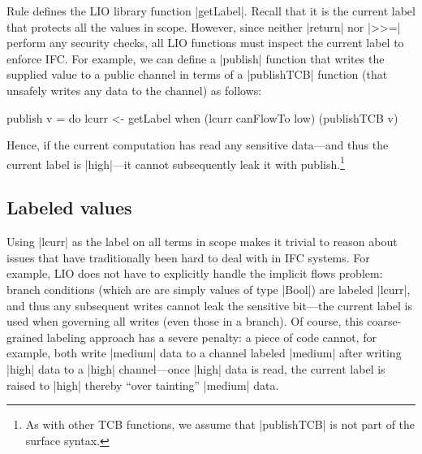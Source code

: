Rule  defines the LIO library function |getLabel|.
%
Recall that it is the current label that protects all the values in scope.
%
However, since neither |return| nor |>>=| perform any security checks,
all LIO functions must inspect the current label to enforce IFC.
%
For example, we can define a |publish| function that writes the
supplied value to a public channel in terms of a |publishTCB| function
(that unsafely writes any data to the channel) as follows:
\begin{code}
publish v = do  lcurr <- getLabel 
                when (lcurr canFlowTo low) (publishTCB v)
\end{code}
Hence, if the current computation has read any sensitive data---and
thus the current label is |high|---it cannot subsequently leak it with
publish.\footnote{
  As with other TCB functions, we assume that |publishTCB| is not part
  of the surface syntax.
}

\subsection{Labeled values}

Using |lcurr| as the label on all terms in scope makes it trivial to
reason about issues that have traditionally been hard to deal with in
IFC systems.
%
For example, LIO does not have to explicitly handle the implicit flows
problem: branch conditions (which are are simply values of type
|Bool|) are labeled |lcurr|, and thus any subsequent writes cannot leak
the sensitive bit---the current label is used when governing all
writes (even those in a branch).
%
Of course, this coarse-grained labeling approach has a severe penalty: a piece
of code cannot, for example, both write |medium| data to a channel
labeled |medium| after writing |high| data to a |high| channel---once
|high| data is read, the current label is raised to |high| thereby
``over tainting'' |medium| data.
 

